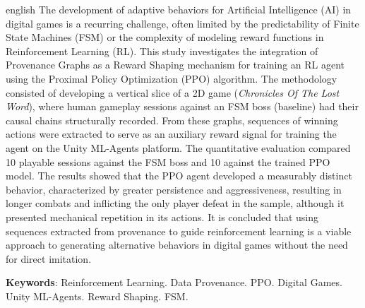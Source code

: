 \documentclass[
    12pt,                %
    openright,           %
    oneside,             %
    a4paper,             %
    chapter=TITLE,       %
    section=TITLE,       %
    english,             %
    brazil               %
]{abntex2}
\begin{document}
\begin{resumo}[Abstract]
    \begin{otherlanguage*}{english}
        The development of adaptive behaviors for Artificial Intelligence (AI) in digital games is a recurring challenge, often limited by the predictability of Finite State Machines (FSM) or the complexity of modeling reward functions in Reinforcement Learning (RL). This study investigates the integration of Provenance Graphs as a Reward Shaping mechanism for training an RL agent using the Proximal Policy Optimization (PPO) algorithm. The methodology consisted of developing a vertical slice of a 2D game (\textit{Chronicles Of The Lost Word}), where human gameplay sessions against an FSM boss (baseline) had their causal chains structurally recorded. From these graphs, sequences of winning actions were extracted to serve as an auxiliary reward signal for training the agent on the Unity ML-Agents platform. The quantitative evaluation compared 10 playable sessions against the FSM boss and 10 against the trained PPO model. The results showed that the PPO agent developed a measurably distinct behavior, characterized by greater persistence and aggressiveness, resulting in longer combats and inflicting the only player defeat in the sample, although it presented mechanical repetition in its actions. It is concluded that using sequences extracted from provenance to guide reinforcement learning is a viable approach to generating alternative behaviors in digital games without the need for direct imitation.

        \textbf{Keywords}: Reinforcement Learning. Data Provenance. PPO.
        Digital Games. Unity ML-Agents. Reward Shaping. FSM.
    \end{otherlanguage*}
\end{resumo}

\listoffigures*
\cleardoublepage

\listoftables*
\cleardoublepage

\end{document}
